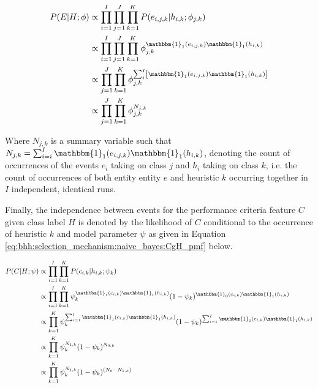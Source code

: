 \begin{equation}
    \label{eq:bhh:selection_mechanism:naive_bayes:EgH_pmf}
    \begin{split}
        P(E \vert H;  \phi)
        &\propto \prod_{i=1}^{I} \prod_{j=1}^{J} \prod_{k=1}^{K} P(e_{i,j,k} \vert h_{i,k} ; \phi_{j,k})  \\
        &\propto \prod_{i=1}^{I} \prod_{j=1}^{J} \prod_{k=1}^{K} \phi_{j,k}^{\mathbbm{1}_{1}(e_{i,j,k})\mathbbm{1}_{1}(h_{i,k})} \\
        &\propto \prod_{j=1}^{J} \prod_{k=1}^{K} \phi_{j,k}^{ \sum_{i}^{I} \left[ \mathbbm{1}_{1}(e_{i,j,k}) \mathbbm{1}_{1}(h_{i,k}) \right]} \\
        &\propto \prod_{j=1}^{J} \prod_{k=1}^{K} \phi_{j,k}^{N_{j,k}}
    \end{split}
\end{equation}

Where $N_{j,k}$ is a summary variable such that $N_{j,k} = \sum_{i=i}^{I}
\mathbbm{1}_{1}(e_{i,j,k})\mathbbm{1}_{1}(h_{i,k})$, denoting the count of
occurrences of the events $e_{i}$ taking on class $j$ and $h_{i}$ taking on
class $k$, i.e. the count of occurrences of both entity entity $e$ and heuristic
$k$ occurring together in $I$ independent, identical runs.

Finally, the independence between events for the performance criteria feature $C$ given class
label $H$ is denoted by the likelihood of $C$ conditional to the occurrence of
heuristic $k$ and model parameter $\psi$ as given in Equation \ref{eq:bhh:selection_mechanism:naive_bayes:CgH_pmf} below.

\begin{equation}
    \label{eq:bhh:selection_mechanism:naive_bayes:CgH_pmf}
    \begin{split}
        P(C\vert H;  \psi)
        &\propto\prod_{i=1}^{I} \prod_{k=1}^{K} P(c_{i,k} \vert h_{i,k} ; \psi_{k})  \\
        &\propto \prod_{i=1}^{I} \prod_{k=1}^{K} \psi_{k}^{\mathbbm{1}_{1}(c_{i,k})\mathbbm{1}_{1}(h_{i,k})} (1 - \psi_{k})^{\mathbbm{1}_{0}(c_{i,k})\mathbbm{1}_{1}(h_{i,k})}\\
        &\propto \prod_{k=1}^{K} \psi_{k}^{\sum_{i=1}^{I} \mathbbm{1}_{1}(c_{i,k})\mathbbm{1}_{1}(h_{i,k})} (1 - \psi_{k})^{\sum_{i=1}^{I} \mathbbm{1}_{0}(c_{i,k})\mathbbm{1}_{1}(h_{i,k})}\\
        &\propto \prod_{k=1}^{K} \psi_{k}^{N_{1,k}} (1 - \psi_{k})^{N_{0,k}} \\
        &\propto \prod_{k=1}^{K} \psi_{k}^{N_{1,k}} (1 - \psi_{k})^{(N_{k} - N_{1,k})}
    \end{split}
\end{equation}

